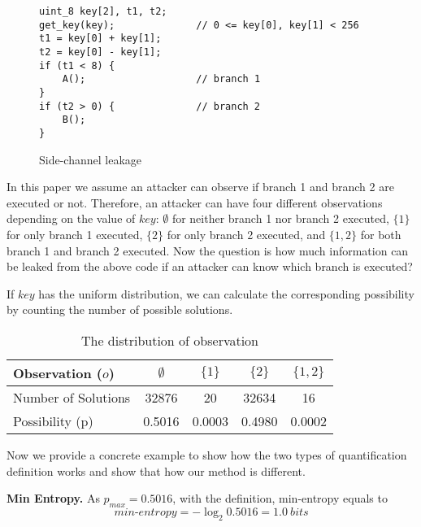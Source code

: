 \begin{figure}[h!]
    \centering
\begin{lstlisting}[xleftmargin=.03\textwidth,xrightmargin=.01\textwidth]
uint_8 key[2], t1, t2;
get_key(key);              // 0 <= key[0], key[1] < 256
t1 = key[0] + key[1];
t2 = key[0] - key[1];
if (t1 < 8) {
    A();                   // branch 1
}
if (t2 > 0) {              // branch 2
    B();
}
\end{lstlisting}
\caption{Side-channel leakage}
\label{background::side-channel}
\end{figure}
In this paper we assume an attacker can observe 
if branch 1 and branch 2 are executed or not. Therefore, 
an attacker can have four different observations depending on
the value of $\mathit{key}$:
$\emptyset$ for neither branch 1 nor branch 2 executed,
$\{1\}$ for only branch 1 executed,
$\{2\}$ for only branch 2 executed, and
 $\{1, 2\}$ for both branch 1 and branch 2 executed.
Now the question is how much information can be leaked from the 
above code if an attacker can know which branch is executed?

If $key$ has the uniform distribution, we can calculate the corresponding
possibility by counting the number of possible solutions.
\begin{table}[ht]
    \centering


\begin{tabular}{l|cccc}
    \hline
Observation ($o$)  & $\emptyset$ & ${\{1\}}$ & ${\{2\}}$ & ${\{1, 2\}}$ \\ \hline
Number of Solutions &  32876 & 20 & 32634 & 16 \\ \hline
Possibility (p)     & 0.5016 & 0.0003 & 0.4980  & 0.0002   \\
    \hline
\end{tabular}
\caption{The distribution of observation}
\label{shtable}
\end{table}


Now we provide a concrete example to show how the two types of quantification definition works and show that
how our method is different.

\vspace{3pt}
\textbf{Min Entropy.}
As $p_{max} = 0.5016$, with the definition, min-entropy equals to 
\begin{displaymath}
    \mathit{min\text{-}entropy} = -\log_2{0.5016} = 1.0\ \mathit{bits}
\end{displaymath}

